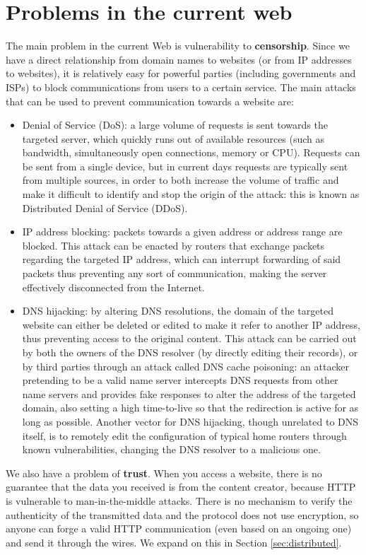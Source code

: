 \documentclass[mscthesis]{usiinfthesis}
\begin{document}
\section{Problems in the current web} \label{sec:problems}
The main problem in the current Web is vulnerability to \textbf{censorship}. Since we have a direct relationship from domain names to websites (or from IP addresses to websites), it is relatively easy for powerful parties (including governments and ISPs) to block communications from users to a certain service. 
The main attacks that can be used to prevent communication towards a website are:
\begin{itemize}
	\item Denial of Service (DoS): a large volume of requests is sent towards the targeted server, which quickly runs out of available resources (such as bandwidth, simultaneously open connections, memory or CPU). Requests can be sent from a single device, but in current days requests are typically sent from multiple sources, in order to both increase the volume of traffic and make it difficult to identify and stop the origin of the attack: this is known as Distributed Denial of Service (DDoS).
	\item IP address blocking: packets towards a given address or address range are blocked. This attack can be enacted by routers that exchange packets regarding the targeted IP address, which can interrupt forwarding of said packets thus preventing any sort of communication, making the server effectively disconnected from the Internet.
	\item DNS hijacking: by altering DNS resolutions, the domain of the targeted website can either be deleted or edited to make it refer to another IP address, thus preventing access to the original content. This attack can be carried out by both the owners of the DNS resolver (by directly editing their records), or by third parties through an attack called DNS cache poisoning: an attacker pretending to be a valid name server intercepts DNS requests from other name servers and provides fake responses to alter the address of the targeted domain, also setting a high time-to-live so that the redirection is active for as long as possible. Another vector for DNS hijacking, though unrelated to DNS itself, is to remotely edit the configuration of typical home routers through known vulnerabilities, changing the DNS resolver to a malicious one.
\end{itemize}

We also have a problem of \textbf{trust}. When you access a website, there is no guarantee that the data you received is from the content creator, because HTTP is vulnerable to man-in-the-middle attacks. There is no mechanism to verify the authenticity of the transmitted data and the protocol does not use encryption, so anyone can forge a valid HTTP communication (even based on an ongoing one) and send it through the wires. We expand on this in Section \ref{sec:distributed}.
\end{document}
